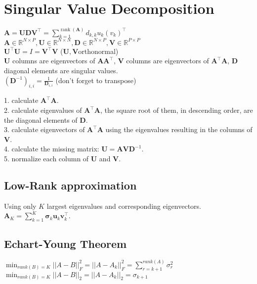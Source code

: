 \section{Singular Value Decomposition}
$\mathbf{A} = \mathbf{U} \mathbf{D} \mathbf{V}^\top = \sum_{k=1}^{\operatorname{rank}(\mathbf{A})} d_{k,k} u_k (v_k)^\top$\\
$\mathbf{A} \in \mathbb{R}^{N \times P}, \mathbf{U} \in \mathbb{R}^{N \times N}, \mathbf{D} \in \mathbb{R}^{N \times P}, \mathbf{V} \in \mathbb{R}^{P \times P}$\\
$\mathbf{U}^\top \mathbf{U} = I = \mathbf{V}^\top \mathbf{V}$ ($\mathbf{U}, \mathbf{V}$orthonormal)\\
$\mathbf{U}$ columns are eigenvectors of $\mathbf{A} \mathbf{A}^\top$, $\mathbf{V}$ columns are eigenvectors of $\mathbf{A}^\top \mathbf{A}$, $\mathbf{D}$ diagonal elements are singular values.\\
$(\mathbf{D}^{-1})_{i,i} = \frac{1}{\mathbf{D}_{i, i}}$ (don't forget to transpose)

1. calculate $\mathbf{A}^\top \mathbf{A}$.\\
2. calculate eigenvalues of $\mathbf{A}^\top \mathbf{A}$, the square root of them, in descending order, are the diagonal elements of $\mathbf{D}$.\\
3. calculate eigenvectors of $\mathbf{A}^\top \mathbf{A}$ using the eigenvalues resulting in the columns of $\mathbf{V}$.\\
4. calculate the missing matrix: $\mathbf{U} = \mathbf{A} \mathbf{V} \mathbf{D}^{-1}$.\\
5. normalize each column of $\mathbf{U}$ and $\mathbf{V}$.

\subsection*{Low-Rank approximation}
Using only $K$ largest eigenvalues and corresponding eigenvectors. $\mathbf{A}_{K} = \sum_{k=1}^K \mathbf{\sigma}_{k} \mathbf{u}_{k} \mathbf{v}^\top_{k}$.

\subsection*{Echart-Young Theorem}
$\min_{rank(B)=K} ||A-B||_F^2 = ||A-A_k||_F^2 = \sum_{r=k+1}^{rank(A)} \sigma_r^2$
$\min_{rank(B)=K} ||A-B||_2 = ||A-A_k||_2 = \sigma_{k+1}$
\vspace{8mm}
